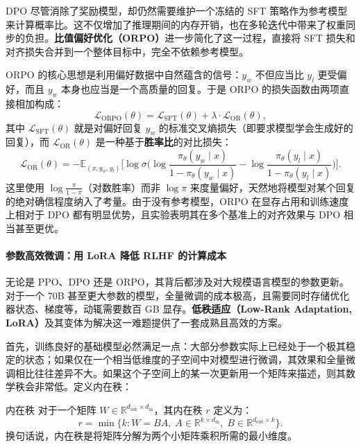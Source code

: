 DPO 尽管消除了奖励模型，却仍然需要维护一个冻结的 SFT 策略作为参考模型来计算概率比。这不仅增加了推理期间的内存开销，也在多轮迭代中带来了权重同步的负担。\textbf{比值偏好优化（ORPO）}进一步简化了这一过程，直接将 SFT 损失和对齐损失合并到一个整体目标中，完全不依赖参考模型。

ORPO 的核心思想是利用偏好数据中自然蕴含的信号：$y_w$ 不但应当比 $y_l$ 更受偏好，而且 $y_w$ 本身也应当是一个高质量的回复。于是 ORPO 的损失函数由两项直接相加构成\cite{hong2024orpo}：
\begin{equation}
    \mathcal{L}_{\text{ORPO}}(\theta) = \mathcal{L}_{\text{SFT}}(\theta) + \lambda \cdot \mathcal{L}_{\text{OR}}(\theta),
\end{equation}
其中 $\mathcal{L}_{\text{SFT}}(\theta)$ 就是对偏好回复 $y_w$ 的标准交叉熵损失（即要求模型学会生成好的回复），而 $\mathcal{L}_{\text{OR}}(\theta)$ 是一种基于\textbf{胜率比}的对比损失：
\begin{equation}
    \mathcal{L}_{\text{OR}}(\theta) = -\mathbb{E}_{(x, y_w, y_l)} \Big[ \log \sigma\!\Big(
        \log \frac{\pi_\theta(y_w \mid x)}{1 - \pi_\theta(y_w \mid x)} - \log \frac{\pi_\theta(y_l \mid x)}{1 - \pi_\theta(y_l \mid x)}
    \Big) \Big].
\end{equation}
这里使用 $\log \frac{\pi}{1-\pi}$（对数胜率）而非 $\log \pi$ 来度量偏好，天然地将模型对某个回复的绝对确信程度纳入了考量。由于没有参考模型，ORPO 在显存占用和训练速度上相对于 DPO 都有明显优势，且实验表明其在多个基准上的对齐效果与 DPO 相当甚至更优。

\paragraph{参数高效微调：用 LoRA 降低 RLHF 的计算成本}

无论是 PPO、DPO 还是 ORPO，其背后都涉及对大规模语言模型的参数更新。对于一个 70B 甚至更大参数的模型，全量微调的成本极高，且需要同时存储优化器状态、梯度等，动辄需要数百 GB 显存。\textbf{低秩适应（Low-Rank Adaptation, LoRA）}及其变体为解决这一难题提供了一套成熟且高效的方案。

首先，训练良好的基础模型必然满足一点：大部分参数实际上已经处于一个极其稳定的状态；如果仅在一个相当低维度的子空间中对模型进行微调，其效果和全量微调相比往往差异不大\cite{aghajanyan2020intrinsicdimensionalityexplainseffectiveness}。如果这个子空间上的某一次更新用一个矩阵来描述，则其数学秩会非常低。定义内在秩：
\begin{definition}{内在秩}{}
    对于一个矩阵 $W \in \mathbb{R}^{d_\text{out} \times d_\text{in}}$，其内在秩 $r$ 定义为：
    \[
        r = \min\{k : W = B A, \; A \in \mathbb{R}^{k \times d_\text{in}}, \; B \in \mathbb{R}^{d_\text{out} \times k}\}.
    \]
    换句话说，内在秩是将矩阵分解为两个小矩阵乘积所需的最小维度。
\end{definition}

